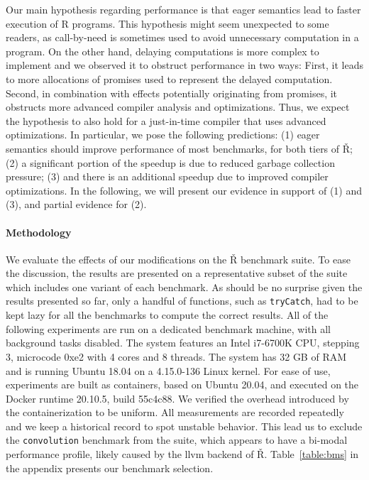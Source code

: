 \documentclass[review,nonacm,screen,acmsmall,anonymous=true]{acmart}
\renewcommand{\Rsh}{{\sf\v R}\xspace}
\begin{document}
Our main hypothesis regarding performance is that eager semantics lead to faster
execution of R programs. This hypothesis might seem unexpected to some readers,
as call-by-need is sometimes used to avoid unnecessary computation in a program.
On the other hand, delaying computations is more complex to implement and we
observed it to obstruct performance in two ways: First, it leads to more
allocations of promises used to represent the delayed computation. Second, in
combination with effects potentially originating from promises, it obstructs
more advanced compiler analysis and optimizations. Thus, we expect the hypothesis
to also hold for a just-in-time compiler that uses advanced optimizations.
In particular, we pose the following predictions:
(1) eager semantics should improve performance of most benchmarks, for both tiers
of \Rsh; (2) a significant portion of the speedup is due to reduced garbage
collection pressure; (3) and there is an additional speedup due to improved compiler
optimizations. In the following, we will present our evidence in support of (1)
and (3), and partial evidence for (2).

\paragraph{Methodology}

We evaluate the effects of our modifications on the \Rsh benchmark suite.
To ease the discussion, the results are presented on a representative subset of
the suite which includes one variant of
each benchmark. As should be no surprise given the results presented so far,
only a handful of functions, such as
\lstinline{tryCatch}, had to be kept lazy for all the benchmarks to compute
the correct results.
All of the following experiments are run on a dedicated benchmark machine, with
all background tasks disabled. The system features an Intel i7-6700K CPU, stepping 3,
microcode 0xe2 with 4 cores and 8 threads. The system has 32 GB of RAM and is
running Ubuntu 18.04 on a 4.15.0-136 Linux kernel. For ease of use, experiments
are built as containers, based on Ubuntu 20.04, and executed on
the Docker runtime 20.10.5, build 55c4c88. We verified the overhead introduced by
the containerization to be uniform. All measurements are recorded repeatedly and we
keep a historical record to spot unstable behavior. This lead us to exclude the
\lstinline{convolution} benchmark from the suite, which appears to have a
bi-modal performance profile, likely caused by the llvm backend of \Rsh.
Table~\ref{table:bms} in the appendix presents our benchmark selection.
\end{document}
